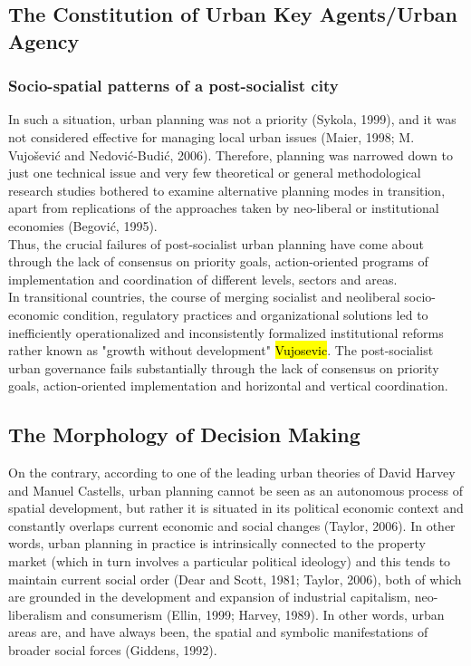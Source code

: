 \documentclass[11pt]{report}
\begin{document}
\subsection{The Constitution of Urban Key Agents/Urban Agency}


\subsubsection{Socio-spatial patterns of a post-socialist city}
In such a situation, urban planning was not a priority (Sykola, 1999), and it was not considered effective for managing local urban issues (Maier, 1998; M. Vujošević and Nedović-Budić, 2006). Therefore, planning was narrowed down to just one technical issue and very few theoretical or general methodological research studies bothered to examine alternative planning modes in transition, apart from replications of the approaches taken by neo-liberal or institutional economies (Begović, 1995).
\\
Thus, the crucial failures of post-socialist urban planning have come about through the lack of consensus on priority goals, action-oriented programs of implementation and coordination of different levels, sectors and areas. 
\\
In transitional countries, the course of merging socialist and neoliberal socio-economic condition, regulatory practices and organizational solutions led to inefficiently operationalized and inconsistently formalized institutional reforms rather known as "growth without development" \hl{Vujosevic}.
The post-socialist urban governance fails substantially through the lack of consensus on priority goals, action-oriented implementation and horizontal and vertical coordination.

\subsection{The Morphology of Decision Making}
On the contrary, according to one of the leading urban theories of David Harvey and Manuel Castells, urban planning cannot be seen as an autonomous process of spatial development, but rather it is situated in its political economic context and constantly overlaps current economic and social changes  (Taylor, 2006). In other words, urban planning in practice is intrinsically connected to the property market (which in turn involves a particular political ideology) and this tends to maintain current social order (Dear and Scott, 1981; Taylor, 2006), both of which are grounded in the development and expansion of industrial capitalism, neo-liberalism and consumerism (Ellin, 1999; Harvey, 1989). In other words, urban areas are, and have always been, the spatial and symbolic manifestations of broader social forces (Giddens, 1992).
\end{document}
